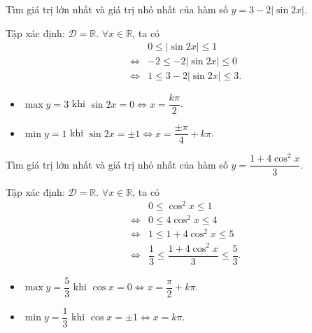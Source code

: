 \begin{bt}%
	Tìm giá trị lớn nhất và giá trị nhỏ nhất của hàm số $ y=3-2|\sin 2 x| $.
	\loigiai
	{
		Tập xác định: $ \mathscr{D}=\mathbb{R}$. $ \forall x \in \mathbb{R} $, ta có 
		\begin{eqnarray*}
			&&0\leq	|\sin 2 x|\leq 1\\
			&\Leftrightarrow&  -2\leq	-2|\sin 2 x|\leq 0\\
			&\Leftrightarrow&  1\leq	3-2|\sin 2 x|\leq 3.
		\end{eqnarray*}
		\begin{itemize}
			\item $ \max y=3 $ khi $ \sin 2 x=0 \Leftrightarrow x=\dfrac{k\pi}{2}$.
			\item $ \min y=1$ khi $ \sin 2 x=\pm1 \Leftrightarrow x=\dfrac{\pm\pi}{4}+k\pi$.
		\end{itemize}
		
	}
\end{bt}
\begin{bt}%
	Tìm giá trị lớn nhất và giá trị nhỏ nhất của hàm số $ y=\dfrac{1+4 \cos ^{2} x}{3} $.
	\loigiai
	{
		Tập xác định: $ \mathscr{D}=\mathbb{R}$. $ \forall x \in \mathbb{R} $, ta có 
		\begin{eqnarray*}
			&& 0\leq \cos ^{2} x \leq 1\\
			&\Leftrightarrow& 0\leq 4\cos ^{2} x \leq 4\\
			&\Leftrightarrow& 1\leq 1+4\cos ^{2} x \leq5\\
			&\Leftrightarrow& \dfrac{1}{3}\leq \dfrac{1+4\cos ^{2} x}{3} \leq \dfrac{5}{3}.
		\end{eqnarray*}
		\begin{itemize}
			\item $ \max y=\dfrac{5}{3} $ khi $ \cos x=0 \Leftrightarrow x=\dfrac{\pi}{2}+k\pi$.
			\item $ \min y=\dfrac{1}{3} $ khi $ \cos  x=\pm1 \Leftrightarrow x=k\pi$.
		\end{itemize}
		
	}
\end{bt}
